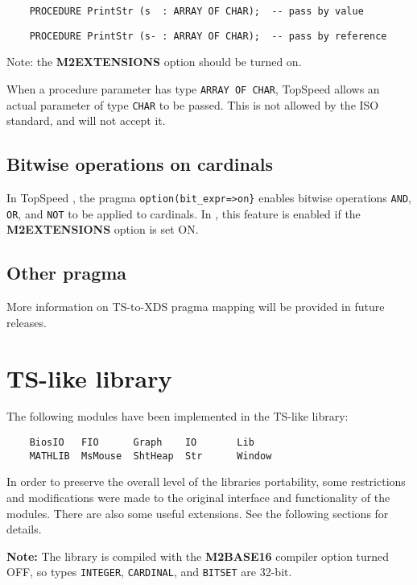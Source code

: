 \verb'    PROCEDURE PrintStr (s  : ARRAY OF CHAR);  -- pass by value'

\verb'    PROCEDURE PrintStr (s- : ARRAY OF CHAR);  -- pass by reference'

    Note: the {\bf M2EXTENSIONS} option should be turned on.

    When a procedure parameter has type \verb'ARRAY OF CHAR', TopSpeed allows an
    actual parameter of type \verb'CHAR' to be passed. This is not allowed by
    the ISO standard, and \xds{} will not accept it.

\subsection{Bitwise operations on cardinals}

    In TopSpeed \mt{}, the pragma \verb'option(bit_expr=>on}' enables
    bitwise operations \verb'AND', \verb'OR', and \verb'NOT' to be applied
    to cardinals. In \XDS{}, this feature is enabled if the {\bf M2EXTENSIONS}
    option is set ON.

\subsection{Other pragma}

    More information on TS-to-XDS pragma mapping will be provided in future releases.

\pagebreak

\section{\xds{} TS-like library}
\label{tsco:lib}

The following modules have been implemented in the \xds{} TS-like library:

    \verb'    BiosIO   FIO      Graph    IO       Lib'  \\
    \verb'    MATHLIB  MsMouse  ShtHeap  Str      Window'

In order to preserve the overall level of the \xds{} libraries portability,
some restrictions and modifications were made to the original
interface and functionality of the modules. There are also some useful 
extensions. See the following sections for details.

{\bf Note:} The library is compiled with the {\bf M2BASE16} compiler option
turned OFF, so types \verb'INTEGER', \verb'CARDINAL', and \verb'BITSET' 
are 32-bit.


